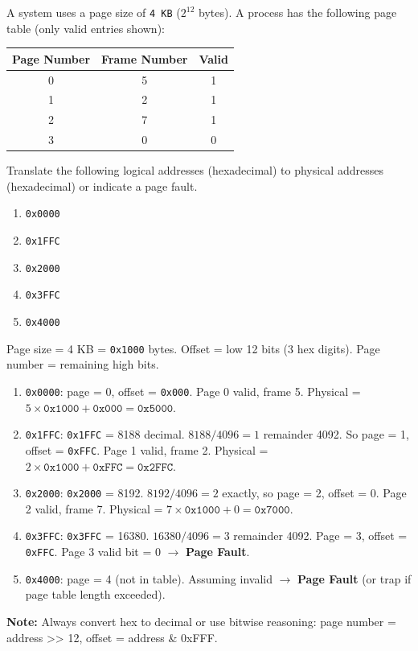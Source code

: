 \documentclass[11pt]{article}
\begin{document}
\begin{exoresolu}
A system uses a page size of \texttt{4 KB} ($2^{12}$ bytes). A process has the following page table (only valid entries shown):
\begin{center}
\begin{tabular}{|c|c|c|}\hline
Page Number & Frame Number & Valid \\ \hline
0 & 5 & 1 \\
1 & 2 & 1 \\
2 & 7 & 1 \\
3 & 0 & 0 \\ \hline
\end{tabular}
\end{center}
Translate the following logical addresses (hexadecimal) to physical addresses (hexadecimal) or indicate a page fault.
\begin{enumerate}
\item \texttt{0x0000}
\item \texttt{0x1FFC}
\item \texttt{0x2000}
\item \texttt{0x3FFC}
\item \texttt{0x4000}
\end{enumerate}
\tcblower
Page size = 4 KB = \texttt{0x1000} bytes. Offset = low 12 bits (3 hex digits). Page number = remaining high bits.
\begin{enumerate}
\item \texttt{0x0000}: page = 0, offset = \texttt{0x000}. Page 0 valid, frame 5. Physical = $5 \times \texttt{0x1000} + \texttt{0x000} = \texttt{0x5000}$.
\item \texttt{0x1FFC}: \texttt{0x1FFC} = 8188 decimal. $8188 / 4096 = 1$ remainder 4092. So page = 1, offset = \texttt{0xFFC}. Page 1 valid, frame 2. Physical = $2 \times \texttt{0x1000} + \texttt{0xFFC} = \texttt{0x2FFC}$.
\item \texttt{0x2000}: \texttt{0x2000} = 8192. $8192 / 4096 = 2$ exactly, so page = 2, offset = 0. Page 2 valid, frame 7. Physical = $7 \times \texttt{0x1000} + 0 = \texttt{0x7000}$.
\item \texttt{0x3FFC}: \texttt{0x3FFC} = 16380. $16380 / 4096 = 3$ remainder 4092. Page = 3, offset = \texttt{0xFFC}. Page 3 valid bit = 0 $\rightarrow$ \textbf{Page Fault}.
\item \texttt{0x4000}: page = 4 (not in table). Assuming invalid $\rightarrow$ \textbf{Page Fault} (or trap if page table length exceeded).
\end{enumerate}
\textbf{Note:} Always convert hex to decimal or use bitwise reasoning: page number = address >> 12, offset = address \& 0xFFF.
\end{exoresolu}
\end{document}

